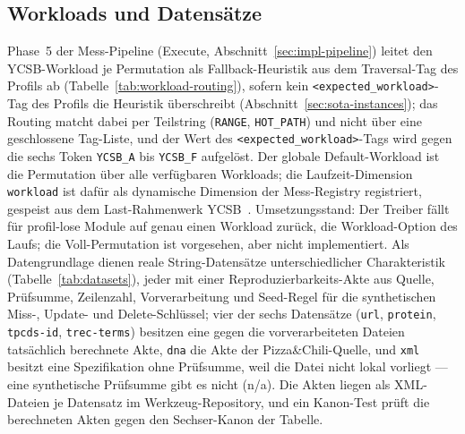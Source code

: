 \begin{nurlang}
\subsection{Workloads und Datensätze}\label{sec:eval-workloads}
Phase~5 der Mess-Pipeline (Execute, Abschnitt~\ref{sec:impl-pipeline}) leitet den YCSB-Workload je
Permutation als Fallback-Heuristik aus dem Traversal-Tag des Profils ab
(Tabelle~\ref{tab:workload-routing}), sofern kein \texttt{<expected\_workload>}-Tag des Profils die
Heuristik überschreibt (Abschnitt~\ref{sec:sota-instances}); das Routing matcht dabei per Teilstring
(\texttt{RANGE}, \texttt{HOT\_PATH}) und nicht über eine geschlossene Tag-Liste, und der Wert des
\texttt{<expected\_workload>}-Tags wird gegen die sechs Token \texttt{YCSB\_A} bis \texttt{YCSB\_F}
aufgelöst. Der globale Default-Workload ist die Permutation über alle verfügbaren Workloads; die
Laufzeit-Dimension \texttt{workload} ist dafür als dynamische Dimension der Mess-Registry
registriert, gespeist aus dem Last-Rahmenwerk YCSB~\cite{cooper2010ycsb}. Umsetzungsstand: Der
Treiber fällt für profil-lose Module auf genau einen Workload zurück, die Workload-Option des Laufs;
die Voll-Permutation ist vorgesehen, aber nicht implementiert. Als
Datengrundlage dienen reale String-Datensätze unterschiedlicher Charakteristik
(Tabelle~\ref{tab:datasets}), jeder mit einer Reproduzierbarkeits-Akte aus Quelle, Prüfsumme,
Zeilenzahl, Vorverarbeitung und Seed-Regel für die synthetischen Miss-, Update- und Delete-Schlüssel;
vier der sechs Datensätze (\texttt{url}, \texttt{protein}, \texttt{tpcds-id}, \texttt{trec-terms})
besitzen eine gegen die vorverarbeiteten Dateien tatsächlich berechnete Akte, \texttt{dna} die Akte der
Pizza\&Chili-Quelle, und \texttt{xml} besitzt eine Spezifikation ohne Prüfsumme, weil die Datei nicht
lokal vorliegt --- eine synthetische Prüfsumme gibt es nicht (n/a). Die Akten liegen als XML-Dateien je
Datensatz im Werkzeug-Repository, und ein Kanon-Test prüft die berechneten Akten gegen den Sechser-Kanon
der Tabelle.
\end{nurlang}
